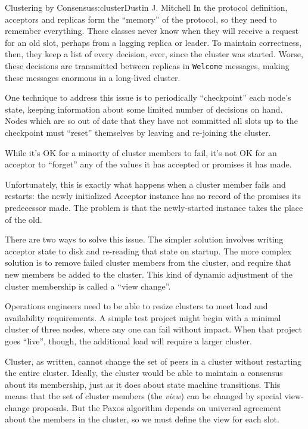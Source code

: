 \begin{aosachapter}{Clustering by Consensus}{s:cluster}{Dustin J. Mitchell}
In the protocol definition, acceptors and replicas form the ``memory''
of the protocol, so they need to remember everything. These classes
never know when they will receive a request for an old slot, perhaps
from a lagging replica or leader. To maintain correctness, then, they
keep a list of every decision, ever, since the cluster was started.
Worse, these decisions are transmitted between replicas in
\texttt{Welcome} messages, making these messages enormous in a
long-lived cluster.

One technique to address this issue is to periodically ``checkpoint''
each node's state, keeping information about some limited number of
decisions on hand. Nodes which are so out of date that they have not
committed all slots up to the checkpoint must ``reset'' themselves by
leaving and re-joining the cluster.

\label{persistent-storage}

While it's OK for a minority of cluster members to fail, it's not OK for
an acceptor to ``forget'' any of the values it has accepted or promises
it has made.

Unfortunately, this is exactly what happens when a cluster member fails
and restarts: the newly initialized Acceptor instance has no record of
the promises its predecessor made. The problem is that the newly-started
instance takes the place of the old.

There are two ways to solve this issue. The simpler solution involves
writing acceptor state to disk and re-reading that state on startup. The
more complex solution is to remove failed cluster members from the
cluster, and require that new members be added to the cluster. This kind
of dynamic adjustment of the cluster membership is called a ``view
change''.

\label{view-changes}

Operations engineers need to be able to resize clusters to meet load and
availability requirements. A simple test project might begin with a
minimal cluster of three nodes, where any one can fail without impact.
When that project goes ``live'', though, the additional load will
require a larger cluster.

Cluster, as written, cannot change the set of peers in a cluster without
restarting the entire cluster. Ideally, the cluster would be able to
maintain a consensus about its membership, just as it does about state
machine transitions. This means that the set of cluster members (the
\emph{view}) can be changed by special view-change proposals. But the
Paxos algorithm depends on universal agreement about the members in the
cluster, so we must define the view for each slot.


\end{aosachapter}
